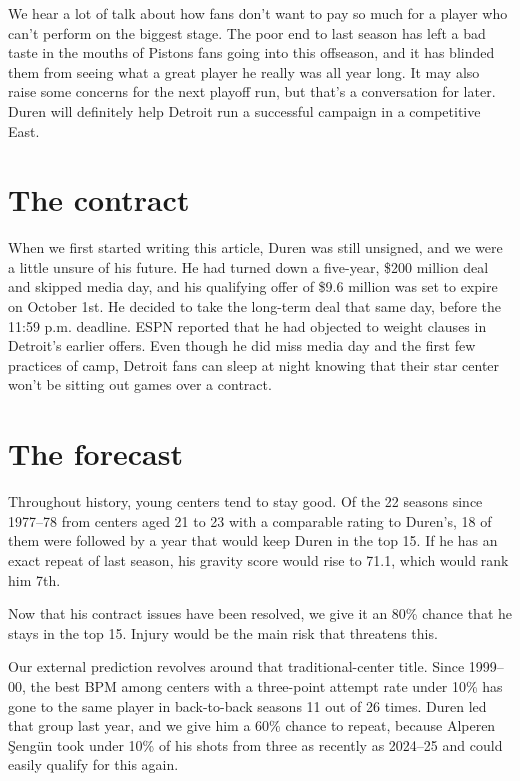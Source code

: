 \documentclass[11pt]{article}
\begin{document}
We hear a lot of talk about how fans don't want to pay so much for a player who can't perform
on the biggest stage. The poor end to last season has left a bad taste in the mouths of
Pistons fans going into this offseason, and it has blinded them from seeing what a great
player he really was all year long. It may also raise some concerns for the next playoff run,
but that's a conversation for later. Duren will definitely help Detroit run a successful
campaign in a competitive East.

\section*{The contract}

When we first started writing this article, Duren was still unsigned, and we were a little
unsure of his future. He had turned down a five-year, \$200 million deal and skipped media
day, and his qualifying offer of \$9.6 million was set to expire on October
1st.
He decided to take the long-term deal that same day, before the 11:59 p.m. deadline. ESPN
reported that he had objected to weight clauses in Detroit's earlier
offers.
Even though he did miss media day and the first few practices of camp, Detroit fans can sleep
at night knowing that their star center won't be sitting out games over a contract.

\section*{The forecast}

Throughout history, young centers tend to stay good. Of the 22 seasons since 1977--78 from
centers aged 21 to 23 with a comparable rating to Duren's, 18 of them were followed by a year
that would keep Duren in the top 15. If he has an exact repeat of last season, his gravity score would rise to 71.1,
which would rank him 7th.

Now that his contract issues have been resolved, we give it an 80\% chance that he stays in
the top 15. Injury would be the main risk
that threatens this.

Our external prediction revolves around that traditional-center title. Since 1999--00, the
best BPM among centers with a three-point attempt rate under 10\% has gone to the same player
in back-to-back seasons 11 out of 26 times. Duren led that group last year, and we give him a
60\% chance to repeat, because Alperen Şengün took under 10\% of his shots from three as
recently as 2024--25 and could easily qualify for this again.
\end{document}
